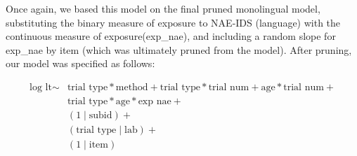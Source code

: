 \documentclass[,man,floatsintext]{apa6}
\begin{document}
Once again, we based this model on the final pruned monolingual model, substituting the binary measure of exposure to NAE-IDS (language) with the continuous measure of exposure(exp\_nae), and including a random slope for exp\_nae by item (which was ultimately pruned from the model). After pruning, our model was specified as follows:

\begin{equation}
\begin{split}
\text{log lt} \sim & \text{trial type} * \text{method} + \text{trial type} * \text{trial num} + \text{age} * \text{trial num} + \\
& \text{trial type} * \text{age} * \text{exp nae} + \\
& (1\mid \text{subid}) + \\
& (\text{trial type} \mid \text{lab}) + \\
& (1 \mid \text{item})
\end{split}
\end{equation}
\end{document}
